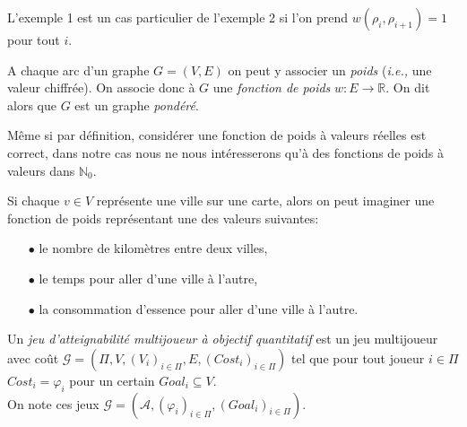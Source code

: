 \begin{rem}
	L'exemple 1 est un cas particulier de l'exemple 2 si l'on prend $w(\rho_{i},\rho_{i+1}) = 1$ pour tout $i$.
\end{rem}

\begin{defi}
	\label{def:fonctionPoids}
	A chaque arc d'un graphe $G = (V,E)$ on peut y associer un \textit{poids} (\emph{i.e.,} une valeur chiffrée). On associe donc à $G$ une \textit{fonction de poids}  $w : E \rightarrow \mathbb{R}$. On dit alors que $G$ est un graphe \textit{pondéré}.
\end{defi}
\begin{rem}
	Même si par définition, considérer une fonction de poids à valeurs réelles est correct, dans notre cas nous ne nous intéresserons qu'à des fonctions de poids à valeurs dans $\mathbb{N}_0$.
\end{rem}

\begin{exemple}
	Si chaque $v \in V$ représente une ville sur une carte, alors on peut imaginer une fonction de poids représentant une des valeurs suivantes:
	\begin{enumerate}
		\item [$\bullet$] le nombre de kilomètres entre deux villes,
		\item [$\bullet$] le temps pour aller d'une ville à l'autre,
		\item [$\bullet$] la consommation d'essence pour aller d'une ville à l'autre.
	\end{enumerate}
\end{exemple}



\begin{defi}
	
	Un \textit{jeu d'atteignabilité multijoueur à objectif quantitatif} est un jeu multijoueur avec coût $\mathcal{G} = (\Pi ,V ,(V_{i})_{i \in \Pi} ,E ,(Cost_{i})_{i \in \Pi})$ tel que pour tout joueur $i \in \Pi$ $Cost_{i} = \varphi _{i}$ pour un certain $Goal _{i} \subseteq V$.\\
	On note ces jeux $\mathcal{G} = (\mathcal{A},(\varphi _{i})_{i\in \Pi},(Goal_{i})_{i \in \Pi})$.
\end{defi}
	






